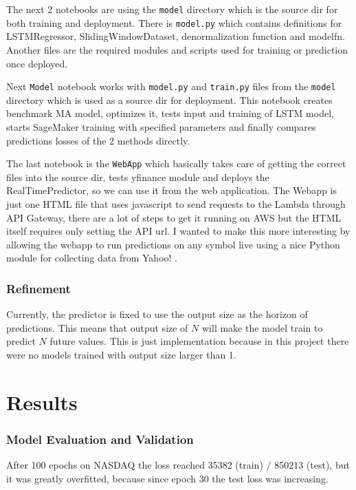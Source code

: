 \documentclass[a4paper,12pt]{article}
\begin{document}
The next 2 notebooks are using the \texttt{model} directory which is the source dir for both training and deployment. There is \texttt{model.py} which contains definitions for LSTMRegressor, SlidingWindowDataset, denormalization function and model\textunderscore fn. Another files are the required modules and scripts used for training or prediction once deployed.

Next \texttt{Model} notebook works with \texttt{model.py} and \texttt{train.py} files from the \texttt{model} directory which is used as a source dir for deployment. This notebook creates benchmark MA model, optimizes it, tests input and training of LSTM model, starts SageMaker training with specified parameters and finally compares predictions losses of the 2 methods directly.

The last notebook is the \texttt{WebApp} which basically takes care of getting the correct files into the source dir, tests yfinance module and deploys the RealTimePredictor, so we can use it from the web application.
The Webapp is just one HTML file that uses javascript to send requests to the Lambda through API Gateway, there are a lot of steps to get it running on AWS but the HTML itself requires only setting the API url. I wanted to make this more interesting by allowing the webapp to run predictions on any symbol live using a nice Python module for collecting data from Yahoo! \cite{yf}.

\section{Refinement}
Currently, the predictor is fixed to use the output size as the horizon of predictions. This means that output size of $N$ will make the model train to predict $N$ future values. This is just implementation because in this project there were no models trained with output size larger than 1.


\part{Results}
\section{Model Evaluation and Validation}
After 100 epochs on NASDAQ the loss reached 35382 (train) / 850213 (test), but it was greatly overfitted, because since epoch 30 the test loss was increasing.
\end{document}
